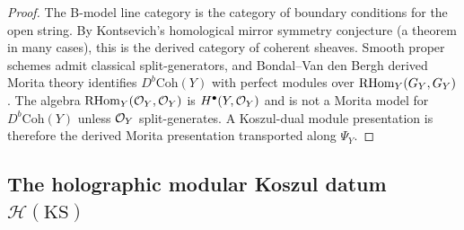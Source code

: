 \begin{proof}
The B-model line category is the category of boundary conditions
for the open string. By Kontsevich's homological mirror symmetry
conjecture (a theorem in many cases), this is the derived category
of coherent sheaves. Smooth proper schemes admit classical
split-generators, and Bondal--Van den Bergh derived Morita theory
identifies $D^b\mathrm{Coh}(Y)$ with perfect modules over
$\operatorname{RHom}_Y(G_Y,G_Y)$. The algebra
$\operatorname{RHom}_Y(\mathcal O_Y,\mathcal O_Y)$ is $H^\bullet(Y,\mathcal O_Y)$ and is not a Morita
model for $D^b\mathrm{Coh}(Y)$ unless $\mathcal O_Y$ split-generates. A
Koszul-dual module presentation is therefore the derived Morita
presentation transported along $\Psi_Y$.
\end{proof}


\subsection{The holographic modular Koszul datum \texorpdfstring{$\mathcal{H}(\mathrm{KS})$}{H(KS)}}

